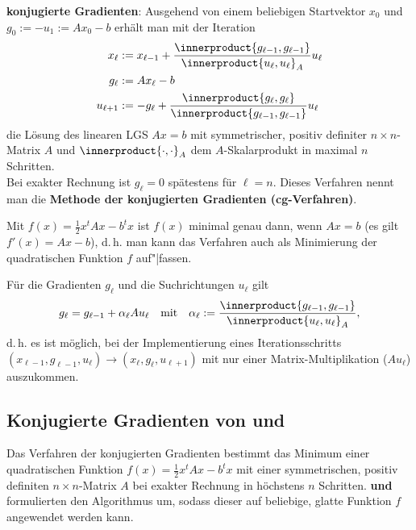 \linie

\textbf{konjugierte Gradienten}:
Ausgehend von einem beliebigen Startvektor $x_0$ und \\
$g_0 := -u_1 := Ax_0 - b$ erhält man mit der Iteration
\begin{align*}
    x_\ell & := x_{\ell-1} +
    \frac{\innerproduct{g_{\ell-1}, g_{\ell-1}}}{\innerproduct{u_\ell, u_\ell}_A} u_\ell \\
    g_\ell & := Ax_\ell - b \\
    u_{\ell+1} & := -g_\ell +
    \frac{\innerproduct{g_\ell, g_\ell}}{\innerproduct{g_{\ell-1}, g_{\ell-1}}} u_\ell
\end{align*}
die Lösung des linearen LGS $Ax = b$ mit symmetrischer, positiv definiter
$n \times n$-Matrix $A$ und $\innerproduct{\cdot, \cdot}_A$ dem $A$-Skalarprodukt
in maximal $n$ Schritten. \\
Bei exakter Rechnung ist $g_\ell = 0$ spätestens für $\ell = n$.
Dieses Verfahren nennt man die
\textbf{Methode der konjugierten Gradienten (cg-Verfahren)}.

Mit $f(x) = \frac{1}{2} x^t A x - b^t x$ ist $f(x)$ minimal genau dann, wenn
$Ax = b$ (es gilt $f'(x) = Ax - b$), d.\,h. man kann das Verfahren auch
als Minimierung der quadratischen Funktion $f$ auf"|fassen.

Für die Gradienten $g_\ell$ und die Suchrichtungen $u_\ell$ gilt
\begin{align*}
    g_\ell = g_{\ell-1} + \alpha_\ell A u_\ell \quad\text{mit}\quad
    \alpha_\ell := \frac{\innerproduct{g_{\ell-1}, g_{\ell-1}}}{\innerproduct{u_\ell, u_\ell}_A},
\end{align*}
d.\,h. es ist möglich, bei der Implementierung eines Iterationsschritts \\
$(x_{\ell-1}, g_{\ell-1}, u_\ell) \rightarrow (x_\ell, g_\ell, u_{\ell+1})$
mit nur einer Matrix-Multiplikation ($Au_\ell$) auszukommen.

\pagebreak

\subsection{%
    Konjugierte Gradienten von  und %
}

Das Verfahren der konjugierten Gradienten bestimmt das Minimum einer
quadratischen Funktion $f(x) = \frac{1}{2} x^t A x - b^t x$ mit einer
symmetrischen, positiv definiten $n \times n$-Matrix $A$ bei exakter Rechnung
in höchstens $n$ Schritten.
\textbf{ und } formulierten den Algorithmus um,
sodass dieser auf beliebige, glatte Funktion $f$ angewendet werden kann.

